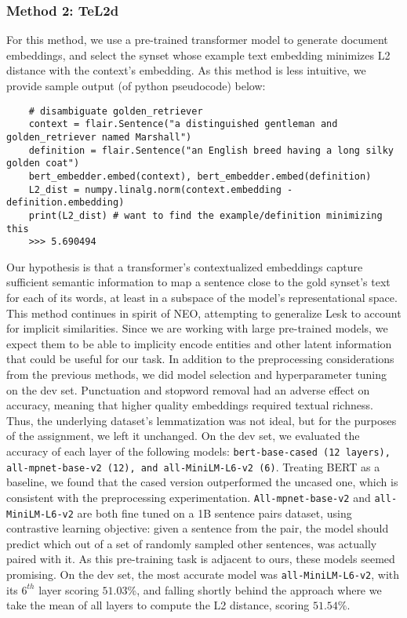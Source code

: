 \documentclass[11pt]{article}
\begin{document}
\subsubsection{Method 2: TeL2d}
For this method, we use a pre-trained transformer
model to generate document embeddings, and select the synset whose example text 
embedding minimizes L2 distance with the context's embedding. As this method is less 
intuitive, we provide sample output (of python pseudocode) below:
\begin{verbatim}
    # disambiguate golden_retriever
    context = flair.Sentence("a distinguished gentleman and golden_retriever named Marshall")
    definition = flair.Sentence("an English breed having a long silky golden coat")
    bert_embedder.embed(context), bert_embedder.embed(definition)
    L2_dist = numpy.linalg.norm(context.embedding - definition.embedding)
    print(L2_dist) # want to find the example/definition minimizing this
    >>> 5.690494
    \end{verbatim}
\vspace{-3ex}
Our hypothesis is that a transformer's contextualized embeddings capture
sufficient semantic information to map a sentence close to the gold synset's
text for each of its words, at least in a subspace of the model's representational space.
This method continues in spirit of NEO, attempting to generalize Lesk 
to account for implicit similarities. Since we are working with large pre-trained 
models, we expect them to be able to implicity encode entities and other latent information
that could be useful for our task. In addition to the preprocessing considerations from the previous methods, 
we did model selection and hyperparameter tuning on the dev set.
Punctuation and stopword removal had an adverse effect on accuracy, meaning that 
higher quality embeddings required textual richness. 
Thus, the underlying dataset's lemmatization was not ideal, but 
for the purposes of the assignment, we left it unchanged. 
On the dev set, we evaluated the accuracy of each layer of the following models: 
\texttt{bert-base-cased (12 layers), all-mpnet-base-v2 (12), and all-MiniLM-L6-v2 (6)}. 
Treating BERT as a baseline, we found that the cased version outperformed the uncased one, 
which is consistent with the preprocessing experimentation. \texttt{All-mpnet-base-v2} and \texttt{all-MiniLM-L6-v2} 
are both fine tuned on a 1B sentence pairs dataset, using contrastive learning objective: 
given a sentence from the pair, the model should predict which out of a set of randomly sampled other sentences, 
was actually paired with it. As this pre-training task is adjacent to ours, these models seemed promising.
On the dev set, the most accurate model was \texttt{all-MiniLM-L6-v2}, with its $6^{th}$ layer scoring $51.03$\%,
and falling shortly behind the approach where we take the mean of all layers to compute the L2 distance, scoring $51.54\%$.
\end{document}
